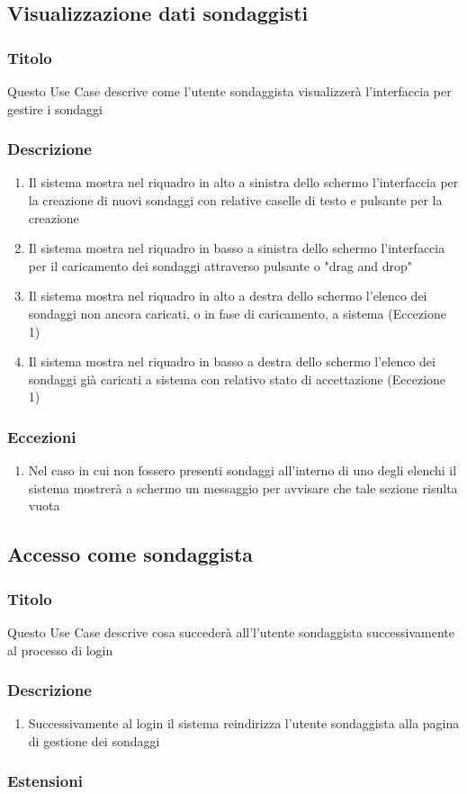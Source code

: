     \subsection{Visualizzazione dati sondaggisti}
        \subsubsection{Titolo}
            Questo Use Case descrive come l'utente sondaggista visualizzerà l'interfaccia per gestire i sondaggi
        \subsubsection{Descrizione}
            \begin{enumerate}
                \item Il sistema mostra nel riquadro in alto a sinistra dello schermo l'interfaccia per la creazione di nuovi sondaggi con relative caselle di testo e pulsante per la creazione
                \item Il sistema mostra nel riquadro in basso a sinistra dello schermo l'interfaccia per il caricamento dei sondaggi attraverso pulsante o "drag and drop"
                \item Il sistema mostra nel riquadro in alto a destra dello schermo l'elenco dei sondaggi non ancora caricati, o in fase di caricamento, a sistema (Eccezione 1)
                \item Il sistema mostra nel riquadro in basso a destra dello schermo l'elenco dei sondaggi già caricati a sistema con relativo stato di accettazione (Eccezione 1)
            \end{enumerate}
        \subsubsection{Eccezioni}
            \begin{enumerate}
                \item Nel caso in cui non fossero presenti sondaggi all'interno di uno degli elenchi il sistema mostrerà a schermo un messaggio per avvisare che tale sezione risulta vuota
            \end{enumerate}

    \subsection{Accesso come sondaggista}
        \subsubsection{Titolo}
            Questo Use Case descrive cosa succederà all'l'utente sondaggista successivamente al processo di login
        \subsubsection{Descrizione}
            \begin{enumerate}
                \item Successivamente al login il sistema reindirizza l'utente sondaggista alla pagina di gestione dei sondaggi
            \end{enumerate}
        \subsubsection{Estensioni}